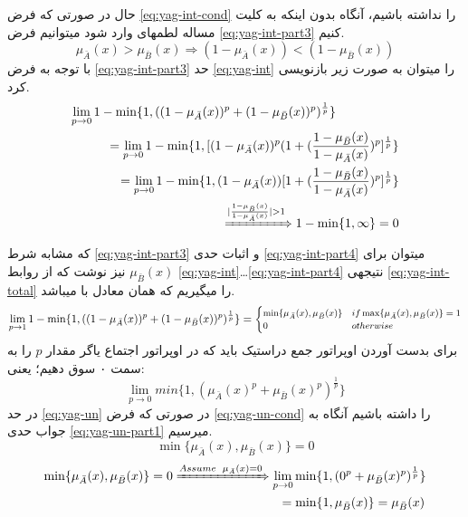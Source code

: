 \documentclass[10pt,a4paper]{article}
\newcommand{\نیمفاصله}{\halfspace}
\renewcommand{\ }{\halfspace}
\newcommand{\mba}{\mu_{\bar{A}}}
\newcommand{\mbb}{\mu_{\bar{B}}}
\begin{document}
حال در صورتی که فرض
\ref{eq:yag-int-cond}
را نداشته باشیم، آنگاه بدون اینکه به کلیت مساله لطمه\ ای وارد شود می\ توانیم فرض
\ref{eq:yag-int-part3}
کنیم.
\begin{equation}
\mba(x) > \mbb(x) \Longrightarrow (1 - \mba(x)) < (1 - \mbb(x)) 
\label{eq:yag-int-part3}
\end{equation}
با توجه به فرض
\ref{eq:yag-int-part3}
حد
\ref{eq:yag-int}
را می\ توان به صورت زیر بازنویسی کرد.
\begin{equation}
\begin{split}
\lim_{p \rightarrow 0} 1 - \min\{1, ((1-\mba(x))^p + (1-\mbb(x))^p)^{\frac{1}{p}}\}\hspace{5em}\\
= \lim_{p \rightarrow 0} 1 - \min\{1, [(1-\mba(x))^p(1 + (\frac{1-\mbb(x)}{1-\mba(x)})^p]^{\frac{1}{p}}\}\\
= \lim_{p \rightarrow 0} 1 - \min\{1, (1-\mba(x))[1 + (\frac{1-\mbb(x)}{1-\mba(x)})^p]^{\frac{1}{p}}\}\\
\xRightarrow{|\frac{1-\mbb(x)}{1-\mba(x)}| > 1} 1 - \min\{1, \infty\} = 0
\end{split}
\label{eq:yag-int-part4}
\end{equation}
که مشابه شرط
\ref{eq:yag-int-part3}
 و اثبات حدی
\ref{eq:yag-int-part4}
می\ توان برای
$\mbb(x)$
نیز نوشت
که از روابط
\ref{eq:yag-int}\ldots\ref{eq:yag-int-part4}
نتیجه\ ی
\ref{eq:yag-int-total}
را می\ گیریم که همان معادل با
می\ باشد.
\begin{equation}\footnotesize
\lim_{p \rightarrow 1} 1 - \min\{1, ((1-\mba(x))^p + (1-\mbb(x))^p)^{\frac{1}{p}}\} = \begin{cases}
\min\{\mba(x) , \mbb(x)\} & if \max\{\mba(x) , \mbb(x)\} = 1\\
0 & otherwise
\end{cases}
\label{eq:yag-int-total}
\end{equation}
برای بدست آوردن اوپراتور جمع دراستیک باید که در اوپراتور اجتماع یاگر مقدار $p$ را به سمت ۰ سوق دهیم؛ یعنی:
\begin{equation}
\lim_{p \rightarrow 0} min\{1, (\mba(x)^p + \mbb(x)^p) ^ {\frac{1}{p}}\}
\label{eq:yag-un}
\end{equation}
در حد
\ref{eq:yag-un}
در صورتی که فرض
\ref{eq:yag-un-cond}
را داشته باشیم آنگاه به جواب حدی
\ref{eq:yag-un-part1}
می\ رسیم.
\begin{equation}
\min\{\mba(x), \mbb(x)\} = 0
\label{eq:yag-un-cond}
\end{equation}
\begin{equation}
\begin{split}
    \min\{\mba(x), \mbb(x)\} = 0 \xRightarrow{Assume\hspace{5pt}\mba(x) = 0} \lim_{p \rightarrow 0} \min\{1, (0^p + \mbb(x)^p)^{\frac{1}{p}}\}\\
    = \min\{1, \mbb(x)\} = \mbb(x)\hspace{1pt}
\end{split}
\label{eq:yag-un-part1}
\end{equation}
\end{document}
